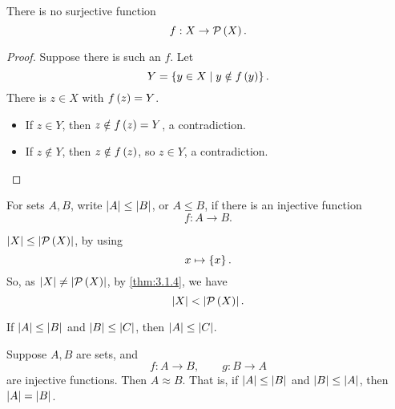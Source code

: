 \begin{theorem}[Cantor]
\label{thm:3.1.4}
There is no surjective function
$$ f : X \to \mathcal{P}\left( X \right). $$
\end{theorem}

\begin{proof}
Suppose there is such an $ f $. Let
$$ Y = \left\{ y \in X \mid y \notin f\left( y \right) \right\}. $$
There is $ z \in X $ with $ f\left( z \right) = Y $.
\begin{itemize}
\item If $ z \in Y $, then $ z \notin f\left( z \right) = Y $, a contradiction.
\item If $ z \notin Y $, then $ z \notin f\left( z \right) $, so $ z \in Y $, a contradiction.
\end{itemize}
\end{proof}


\begin{definition}
For sets $ A, B $, write $ \left\lvert A \right\rvert \le \left\lvert B \right\rvert $, or $ A \le B $, if there is an injective function
$$ f : A \to B. $$
\end{definition}

\begin{note}
$ \left\lvert X \right\rvert \le \left\lvert \mathcal{P}\left( X \right) \right\rvert $, by using
$$ x \mapsto \left\{ x \right\}. $$
So, as $ \left\lvert X \right\rvert \ne \left\lvert \mathcal{P}\left( X \right) \right\rvert $, by \ref{thm:3.1.4}, we have
$$ \left\lvert X \right\rvert < \left\lvert \mathcal{P}\left( X \right) \right\rvert. $$
\end{note}

\begin{example2}
If $ \left\lvert A \right\rvert \le \left\lvert B \right\rvert $ and $ \left\lvert B \right\rvert \le \left\lvert C \right\rvert $, then $ \left\lvert A \right\rvert \le \left\lvert C \right\rvert $.
\end{example2}

\pagebreak

\begin{theorem}
\label{thm:3.1.6}
Suppose $ A, B $ are sets, and
$$ f : A \to B, \qquad g : B \to A $$
are injective functions. Then $ A \approx B $. That is, if $ \left\lvert A \right\rvert \le \left\lvert B \right\rvert $ and $ \left\lvert B \right\rvert \le \left\lvert A \right\rvert $, then $ \left\lvert A \right\rvert = \left\lvert B \right\rvert $.
\end{theorem}


